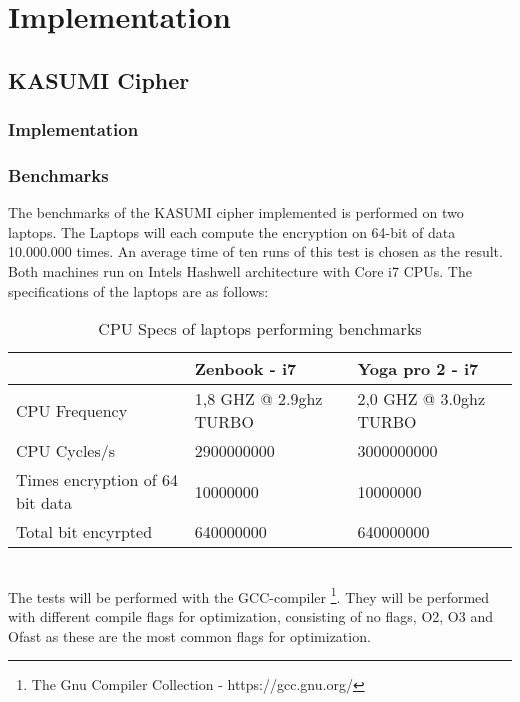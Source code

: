 \chapter{Implementation}
\section{KASUMI Cipher}
\subsection{Implementation}
\subsection{Benchmarks}
The benchmarks of the KASUMI cipher implemented is performed on two
laptops. The Laptops will each compute the encryption on 64-bit of
data 10.000.000 times. An average time of ten runs of this test is
chosen as the result. Both machines run on Intels Hashwell
architecture with Core i7 CPUs. The specifications of the laptops are as follows:
\begin{table}[h!]
    \begin{tabular}{l|l|l}
                                    & Zenbook - i7           & Yoga
                                                               pro 2 -
      i7\\ \hline
    CPU Frequency                   & 1,8 GHZ @ 2.9ghz TURBO & 2,0 GHZ @ 3.0ghz TURBO \\ \hline
    CPU Cycles/s                    & 2900000000             & 3000000000             \\ \hline
    Times encryption of 64 bit data & 10000000               & 10000000               \\ \hline
    Total bit encyrpted             & 640000000              & 640000000              \\
    \end{tabular}
    \caption{CPU Specs of laptops performing benchmarks}
    \label{tab:specs}
\end{table}\\
The tests will be performed with the
GCC-compiler \footnote{The Gnu Compiler Collection -
  https://gcc.gnu.org/}. They will be performed with different compile
flags for optimization, consisting of no flags, O2, O3 and Ofast as
these are the most common flags for optimization. 
